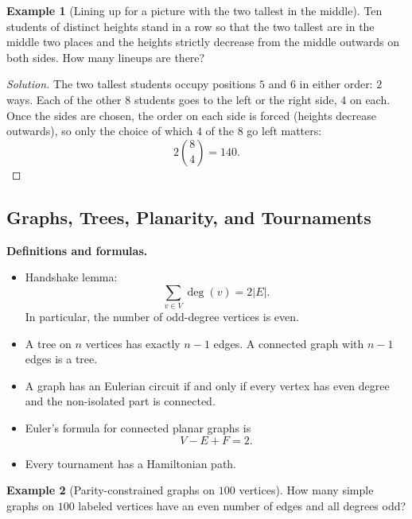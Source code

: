 \documentclass[11pt]{article}
\theoremstyle{definition}
\newtheorem{example}{Example}[section]
\begin{document}
\begin{example}[Lining up for a picture with the two tallest in the middle]
Ten students of distinct heights stand in a row so that the two tallest are in the middle two places and the heights strictly decrease from the middle outwards on both sides. How many lineups are there?
\end{example}

\begin{proof}[Solution]
The two tallest students occupy positions $5$ and $6$ in either order: $2$ ways. Each of the other $8$ students goes to the left or the right side, $4$ on each. Once the sides are chosen, the order on each side is forced (heights decrease outwards), so only the choice of which $4$ of the $8$ go left matters:
\[
2\binom84=\boxed{140}.
\]
\end{proof}

\subsection{Graphs, Trees, Planarity, and Tournaments}
\textbf{Definitions and formulas.}
\begin{itemize}
    \item Handshake lemma:
    \[
        \sum_{v\in V} \deg(v)=2|E|.
    \]
    In particular, the number of odd-degree vertices is even.
    \item A tree on $n$ vertices has exactly $n-1$ edges. A connected graph with $n-1$ edges is a tree.
    \item A graph has an Eulerian circuit if and only if every vertex has even degree and the non-isolated part is connected.
    \item Euler's formula for connected planar graphs is
    \[
        V-E+F=2.
    \]
    \item Every tournament has a Hamiltonian path.
\end{itemize}

\begin{example}[Parity-constrained graphs on $100$ vertices]
How many simple graphs on $100$ labeled vertices have an even number of edges and all degrees odd?
\end{example}
\end{document}

